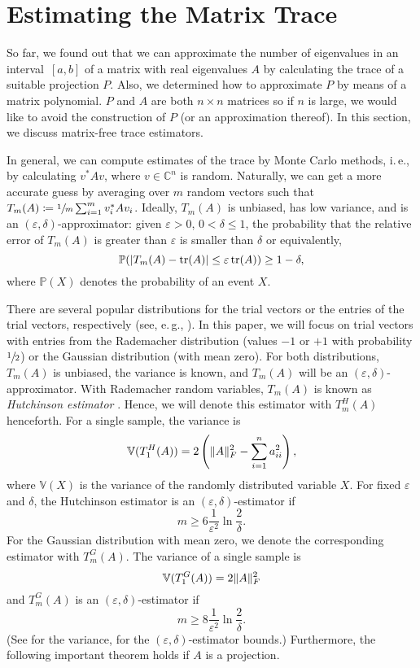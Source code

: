 \documentclass[%
	paper=a4,
	fontsize=10pt,
	DIV11,BCOR10mm,
	numbers=noenddot,
	abstract=yes
]{scrartcl}
\newcommand{\F}{\mathbb{C}}
\DeclarePairedDelimiter\abs{\lvert}{\rvert}
\DeclarePairedDelimiter\norm{\lVert}{\rVert}
\theoremstyle{definition}
\begin{document}
\section{Estimating the Matrix Trace}
\label{sec:estimating-matrix-trace}

So far, we found out that we can approximate the number of eigenvalues in an
interval~$[a, b]$ of a matrix with real eigenvalues $A$ by calculating the trace
of a suitable projection $P$. Also, we determined how to approximate $P$ by
means of a matrix polynomial. $P$ and $A$ are both $n \times n$ matrices so if
$n$ is large, we would like to avoid the construction of $P$ (or an
approximation thereof). In this section, we discuss matrix-free trace
estimators.

In general, we can compute estimates of the trace by Monte Carlo methods,
i.\,e., by calculating $v^* A v$, where $v \in \F^n$ is random. Naturally, we
can get a more accurate guess by averaging over $m$ random vectors such that
$T_m(A) \coloneqq \sfrac{1}{m} \sum_{i=1}^m v_i^* A v_i$. Ideally, $T_m(A)$ is
unbiased, has low variance, and is an $(\varepsilon, \delta)$-approximator:
given $\varepsilon > 0$, $0 < \delta \leq 1$, the probability that the relative
error of $T_m(A)$ is greater than $\varepsilon$ is smaller than $\delta$ or
equivalently,
\[
	\mathbb{P}(
		\abs{T_m(A) - \operatorname{tr}(A)} \leq
		\varepsilon \operatorname{tr}(A) )
	\geq 1 - \delta,
\]
where $\mathbb{P}(X)$ denotes the probability of an event $X$.

There are several popular distributions for the trial vectors or the entries of
the trial vectors, respectively (see, e.\,g., \cite[§3]{Avron2011}). In this
paper, we will focus on trial vectors with entries from the Rademacher
distribution (values $-1$ or $+1$ with probability $\sfrac{1}{2}$) or the
Gaussian distribution (with mean zero). For both distributions, $T_m(A)$ is
unbiased, the variance is known, and $T_m(A)$ will be an $(\varepsilon,
\delta)$-approximator. With Rademacher random variables, $T_m(A)$ is known as
\emph{Hutchinson estimator} \cite{Hutchinson1990}. Hence, we will denote this
estimator with $T_m^H(A)$ henceforth. For a single sample, the variance is
\[
	\mathbb{V}(T_1^H(A)) =
	2 \left( \norm{A}_F^2 - \sum_{i=1}^n a_{ii}^2 \right),
\]
where $\mathbb{V}(X)$ is the variance of the randomly distributed variable $X$.
For fixed $\varepsilon$ and $\delta$, the Hutchinson estimator is an
$(\varepsilon, \delta)$-estimator if
\[ m \geq 6 \frac{1}{\varepsilon^2} \ln \frac{2}{\delta}. \]
For the Gaussian distribution with mean zero, we denote the corresponding
estimator with $T_m^G(A)$. The variance of a single sample is
\[ \mathbb{V}(T_1^G(A)) = 2 \norm{A}_F^2 \]
and $T_m^G(A)$ is an $(\varepsilon, \delta)$-estimator if
\[ m \geq 8 \frac{1}{\varepsilon^2} \ln \frac{2}{\delta}. \]
(See \cite[Table~1]{Avron2011} for the variance, \cite{Roosta-Khorasani2015} for
the $(\varepsilon, \delta)$-estimator bounds.)
Furthermore, the following important theorem holds if $A$ is a projection.
\end{document}
